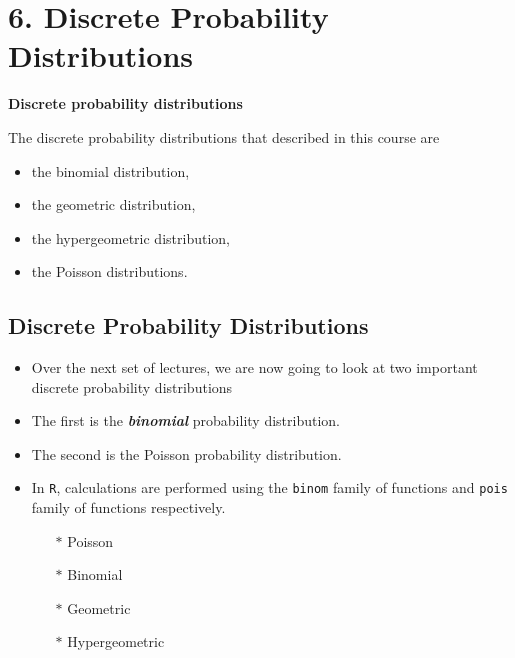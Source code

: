 ﻿\documentclass[]{report}
\begin{document}
\chapter{6. Discrete Probability Distributions}

\noindent \textbf{Discrete probability distributions}

The discrete probability distributions that described in this course are
\begin{itemize}
\item the binomial distribution, 
\item the geometric distribution,
\item the hypergeometric distribution, 
\item the Poisson distributions.
\end{itemize}


\section{Discrete Probability Distributions}
\begin{itemize}
\item Over the next set of lectures, we are now going to look at two important discrete probability distributions

\item The first is the \textbf{\emph{binomial}} probability distribution.

\item The second is the Poisson probability distribution.

\item In \texttt{R}, calculations are performed using the \texttt{binom} family of functions and \texttt{pois} family of functions respectively.
\begin{multicols}{2}
\begin{itemize}
\item[$\ast$] Poisson
\item[$\ast$] Binomial
\item[$\ast$] Geometric
\item[$\ast$] Hypergeometric 
\end{itemize}
\end{multicols}
\end{itemize}
\end{document}
